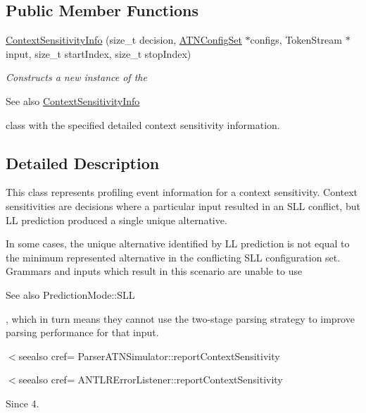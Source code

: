 \subsection*{Public Member Functions}
\begin{DoxyCompactItemize}
\item 
\hyperlink{classantlr4_1_1atn_1_1ContextSensitivityInfo_a900c044cd1a49de278001c48d02898cf}{Context\+Sensitivity\+Info} (size\+\_\+t decision, \hyperlink{classantlr4_1_1atn_1_1ATNConfigSet}{A\+T\+N\+Config\+Set} $\ast$configs, Token\+Stream $\ast$input, size\+\_\+t start\+Index, size\+\_\+t stop\+Index)
\begin{DoxyCompactList}\small\item\em Constructs a new instance of the \begin{DoxySeeAlso}{See also}
\hyperlink{classantlr4_1_1atn_1_1ContextSensitivityInfo}{Context\+Sensitivity\+Info}


\end{DoxySeeAlso}
class with the specified detailed context sensitivity information. \end{DoxyCompactList}\end{DoxyCompactItemize}


\subsection{Detailed Description}
This class represents profiling event information for a context sensitivity. Context sensitivities are decisions where a particular input resulted in an S\+LL conflict, but LL prediction produced a single unique alternative. 

In some cases, the unique alternative identified by LL prediction is not equal to the minimum represented alternative in the conflicting S\+LL configuration set. Grammars and inputs which result in this scenario are unable to use \begin{DoxySeeAlso}{See also}
Prediction\+Mode\+::\+S\+LL


\end{DoxySeeAlso}
, which in turn means they cannot use the two-\/stage parsing strategy to improve parsing performance for that input.

$<$seealso cref= Parser\+A\+T\+N\+Simulator\+::report\+Context\+Sensitivity 

$<$seealso cref= A\+N\+T\+L\+R\+Error\+Listener\+::report\+Context\+Sensitivity

\begin{DoxySince}{Since}
4. 
\end{DoxySince}


